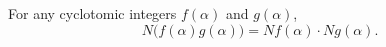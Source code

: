 For any cyclotomic integers $f(\alpha)$ and $g(\alpha)$,
$$N\big(f(\alpha)g(\alpha)\big) = Nf(\alpha) \cdot Ng(\alpha).$$

